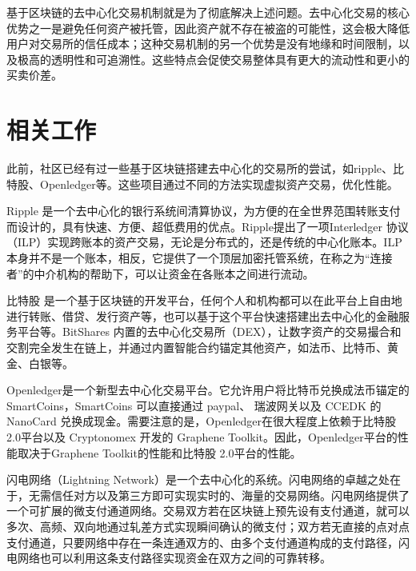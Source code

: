 \documentclass[UTF8,nofonts]{ctexart}
\begin{document}
基于区块链的去中心化交易机制就是为了彻底解决上述问题。去中心化交易的核心优势之一是避免任何资产被托管，因此资产就不存在被盗的可能性，这会极大降低用户对交易所的信任成本；这种交易机制的另一个优势是没有地缘和时间限制，以及极高的透明性和可追溯性。这些特点会促使交易整体具有更大的流动性和更小的买卖价差。

\section{相关工作\label{sec:existingworks}}
此前，社区已经有过一些基于区块链搭建去中心化的交易所的尝试，如ripple、比特股、Openledger等。这些项目通过不同的方法实现虚拟资产交易，优化性能。

Ripple \cite{schwartz2014ripple} 是一个去中心化的银行系统间清算协议，为方便的在全世界范围转账支付而设计的，具有快速、方便、超低费用的优点。Ripple提出了一项Interledger \cite{thomas2015protocol} 协议（ILP）实现跨账本的资产交易，无论是分布式的，还是传统的中心化账本。ILP 本身并不是一个账本，相反，它提供了一个顶层加密托管系统，在称之为“连接者”的中介机构的帮助下，可以让资金在各账本之间进行流动。

比特股 \cite{schuh2015bitshares}\cite{schuhbitshares}  是一个基于区块链的开发平台，任何个人和机构都可以在此平台上自由地进行转账、借贷、发行资产等，也可以基于这个平台快速搭建出去中心化的金融服务平台等。BitShares 内置的去中心化交易所（DEX），让数字资产的交易撮合和交割完全发生在链上，并通过内置智能合约锚定其他资产，如法币、比特币、黄金、白银等。

Openledger是一个新型去中心化交易平台。它允许用户将比特币兑换成法币锚定的 SmartCoins，SmartCoins 可以直接通过 paypal、 瑞波网关以及 CCEDK 的 NanoCard 兑换成现金。需要注意的是，Openledger在很大程度上依赖于比特股 2.0平台以及 Cryptonomex 开发的 Graphene Toolkit。因此，Openledger平台的性能取决于Graphene Toolkit的性能和比特股 2.0平台的性能。

闪电网络（Lightning Network）\cite{poon2015bitcoin}是一个去中心化的系统。闪电网络的卓越之处在于，无需信任对方以及第三方即可实现实时的、海量的交易网络。闪电网络提供了一个可扩展的微支付通道网络。交易双方若在区块链上预先设有支付通道，就可以多次、高频、双向地通过轧差方式实现瞬间确认的微支付；双方若无直接的点对点支付通道，只要网络中存在一条连通双方的、由多个支付通道构成的支付路径，闪电网络也可以利用这条支付路径实现资金在双方之间的可靠转移。



\end{document}
